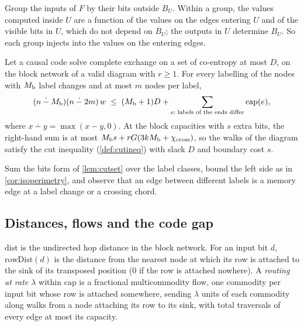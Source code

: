 \begin{outline}
Group the inputs of $F$ by their bits outside $B_U$. Within a group, the values computed inside $U$
are a function of the values on the edges entering $U$ and of the visible bits in $U$, which do not
depend on $B_U$; the outputs in $U$ determine $B_U$. So each group injects into the values on the
entering edges.
\end{outline}

\begin{corollary}\label{cor:isoperimetry-code}
Let a causal code solve complete exchange on a set of co-entropy at most $D$, on the block network
of a valid diagram with $r\ge1$. For every labelling of the nodes with $M_{\mathrm{b}}$ label changes and at
most $m$ nodes per label,
\[
  (n\mathbin{\dot{-}}M_{\mathrm{b}})(n\mathbin{\dot{-}}2m)\,w\;\le\;(M_{\mathrm{b}}+1)D+\sum_{e:\;\text{labels of the ends differ}}\mathrm{cap}(e),
\]
where $x\dotminus y=\max(x-y,0)$.
At the block capacities with $s$ extra bits, the right-hand sum is at most
$M_{\mathrm{b}} s+rG(3kM_{\mathrm{b}}+\chi_{\mathrm{cross}})$, so the walks of the diagram satisfy the cut inequality
(\cref{def:cutineq}) with slack $D$ and boundary cost $s$.
\end{corollary}

\begin{outline}
Sum the bits form of \cref{lem:cutset} over the label classes, bound the left side as in
\cref{cor:isoperimetry}, and observe that an edge between different labels is a memory edge at a
label change or a crossing chord.
\end{outline}

\subsection{Distances, flows and the code gap}

\begin{definition}\label{def:routing}
$\mathrm{dist}$ is the undirected hop distance in the block network. For an input bit $d$,
$\mathrm{rowDist}(d)$ is the distance from the nearest node at which its row is attached to the sink
of its transposed position ($0$ if the row is attached nowhere). A \emph{routing at rate $\lambda$}
within $\mathrm{cap}$ is a fractional multicommodity flow, one commodity per input bit whose row is
attached somewhere, sending $\lambda$ units of each commodity along walks from a node attaching its
row to its sink, with total traversals of every edge at most its capacity.
\end{definition}

